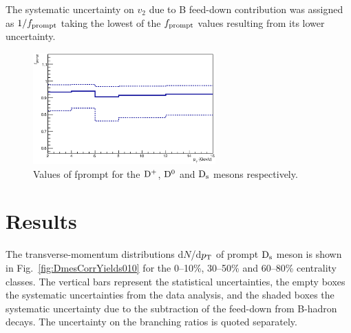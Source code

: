 The systematic uncertainty on $v_2$ due to B feed-down contribution
was assigned as $1/f_{\rm prompt}$ taking the lowest of the
$f_{\rm prompt}$ values resulting from its lower uncertainty.


\begin{figure}
 \centering
 \includegraphics[width=7cm]{FigCap5/fprompt_3050.eps}
\caption{Values of fprompt for the ${\rm D^+}$, ${\rm D^0}$ and ${\rm D_s}$ mesons respectively.}
\label{fig:fPrompt}
\end{figure}

\section{Results}
\label{sec:PbPbResults}
The transverse-momentum distributions d$N$/d$p_{\rm T}$ of prompt ${\rm D_s}$ meson 
is shown in Fig.~\ref{fig:DmesCorrYields010}
for the 0--10\%, 30--50\% and 60--80\% centrality classes. 
The vertical bars represent the statistical uncertainties, the empty boxes
the systematic uncertainties from the data analysis, and the shaded boxes
the systematic uncertainty due to the subtraction of the feed-down from 
B-hadron decays. The uncertainty on the branching ratios is quoted separately.

